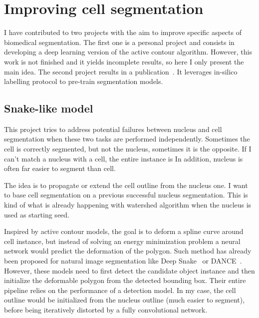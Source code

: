 \section{Improving cell segmentation}
\label{sec:segmentation_improvements}

I have contributed to two projects with the aim to improve specific aspects of biomedical segmentation.
The first one is a personal project and consists in developing a deep learning version of the active contour algorithm.
However, this work is not finished and it yields incomplete results, so here I only present the main idea.
The second project results in a publication~\cite{anonymous_Bonte_2022}.
It leverages in-silico labelling protocol to pre-train segmentation models.

\subsection{Snake-like model}
\label{subsec:segmentation_snake}

This project tries to address potential failures between nucleus and cell segmentation when these two tasks are performed independently.
Sometimes the cell is correctly segmented, but not the nucleus, sometimes it is the opposite.
If I can't match a nucleus with a cell, the entire instance is
In addition, nucleus is often far easier to segment than cell.

The idea is to propagate or extend the cell outline from the nucleus one.
I want to base cell segmentation on a previous successful nucleus segmentation.
This is kind of what is already happening with watershed algorithm when the nucleus is used as starting seed.

Inspired by active contour models, the goal is to deform a spline curve around cell instance, but instead of solving an energy minimization problem a neural network would predict the deformation of the polygon.
Such method has already been proposed for natural image segmentation like Deep Snake~\cite{Peng_2020_CVPR} or DANCE~\cite{Liu_2021}.
However, these models need to first detect the candidate object instance and then initialize the deformable polygon from the detected bounding box.
Their entire pipeline relies on the performance of a detection model.
In my case, the cell outline would be initialized from the nucleus outline (much easier to segment), before being iteratively distorted by a fully convolutional network.


